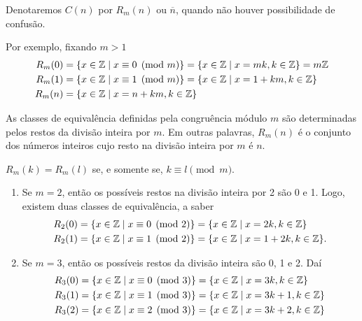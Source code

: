 Denotaremos $C(n)$ por $R_{m}(n)$ ou $\overline{n}$, quando não houver possibilidade de confusão.

Por exemplo, fixando $m > 1$
\begin{align*}
    R_{m}(0) &= \{x \in \mathbb{Z} \mid x\equiv 0 \pmod{m}\}=\{x\in \mathbb{Z} \mid x = mk, k\in\mathbb{Z}\}=m\mathbb{Z}\\
    R_{m}(1) &= \{x\in\mathbb{Z} \mid x\equiv 1 \pmod{m}\}=\{x\in\mathbb{Z} \mid x = 1 + km, k\in\mathbb{Z}\}\\
    R_{m}(n) &= \{x\in\mathbb{Z} \mid x = n + km, k\in\mathbb{Z}\}
\end{align*}

\begin{proposicao}
    As classes de equivalência definidas pela congruência módulo $m$ são determinadas pelos restos da divisão inteira por $m$. Em outras palavras, $R_{m}(n)$ é o conjunto dos números inteiros cujo resto na divisão inteira por $m$ é $n$.
\end{proposicao}

\begin{corolario}
    $R_{m}(k) = R_{m}(l)$ se, e somente se, $k\equiv l \pmod{m}$.
\end{corolario}

\begin{exemplos}
    \begin{enumerate}[label={\arabic*})]
        \item Se $m=2$, então os possíveis restos na divisão inteira por 2 são 0 e 1. Logo, existem duas classes de equivalência, a saber
        \begin{align*}
            R_{2}(0) &= \{x \in \mathbb{Z} \mid x\equiv 0 \pmod{2}\} = \{x\in \mathbb{Z} \mid x = 2k, k\in\mathbb{Z}\}\\
            R_{2}(1) &= \{x\in\mathbb{Z} \mid x\equiv 1 \pmod{2}\} = \{x\in\mathbb{Z} \mid x = 1 + 2k, k\in\mathbb{Z}\}.
        \end{align*}

        \item Se $m = 3$, então os possíveis restos da divisão inteira são 0, 1 e 2. Daí
        \begin{align*}
            R_{3}(0) &= \{x \in \mathbb{Z} \mid x\equiv 0 \pmod{3}\} = \{x\in \mathbb{Z} \mid x = 3k, k \in \mathbb{Z}\}\\
            R_{3}(1) & = \{x \in \mathbb{Z} \mid x\equiv 1 \pmod{3}\} = \{x\in\mathbb{Z} \mid x = 3k + 1, k \in \mathbb{Z}\}\\
            R_{3}(2) &= \{x \in \mathbb{Z} \mid x\equiv 2 \pmod{3}\} = \{x\in\mathbb{Z} \mid x = 3k + 2, k \in \mathbb{Z}\}
        \end{align*}
    \end{enumerate}
\end{exemplos}

